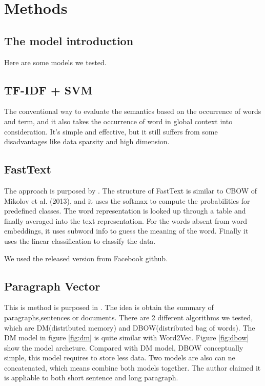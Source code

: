 \chapter{Methods}

\section{The model introduction}

Here are some models we tested.

\section{TF-IDF + SVM}

	The conventional way to evaluate the semantics based on the occurrence of words and term, and it also takes the occurrence of word in global context into consideration.  It's simple and effective, but it still suffers from some disadvantages like data sparsity and high dimension. \\
	
\section{FastText}
	
The approach is purposed by \cite{joulin2016fasttext}. 
The structure of FastText is similar to CBOW of Mikolov et al. (2013), and it uses the softmax to compute the probabilities for predefined classes. 
The word representation is looked up through a table and finally averaged into the text representation. 
For the words absent from word embeddings, it uses subword info\cite{bojanowski2016enriching} to guess the meaning of the word.
Finally it uses the linear classification to classify the data.

We used the released version from Facebook github.

\section{Paragraph Vector}
	
This is method is purposed in \cite{PVDB}. The idea is obtain the summary of paragraphs,sentences or documents. 
There are 2 different algorithms we tested, which are DM(distributed memory) and DBOW(distributed bag of words). 
The DM model in figure \ref{fig:dm} is quite similar with Word2Vec.
Figure \ref{fig:dbow} show the model archeture. Compared with DM model, DBOW conceptually simple, this model requires to store less data. 
Two models are also can ne concatenated, which means combine both models together. The author claimed it is appliable to  both short sentence and long paragraph.\\

